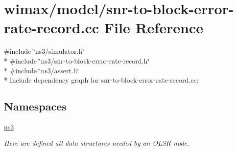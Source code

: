 \hypertarget{snr-to-block-error-rate-record_8cc}{}\section{wimax/model/snr-\/to-\/block-\/error-\/rate-\/record.cc File Reference}
\label{snr-to-block-error-rate-record_8cc}
{\ttfamily \#include \char`\"{}ns3/simulator.\+h\char`\"{}}\\*
{\ttfamily \#include \char`\"{}ns3/snr-\/to-\/block-\/error-\/rate-\/record.\+h\char`\"{}}\\*
{\ttfamily \#include \char`\"{}ns3/assert.\+h\char`\"{}}\\*
Include dependency graph for snr-\/to-\/block-\/error-\/rate-\/record.cc\+:
\subsection*{Namespaces}
\begin{DoxyCompactItemize}
\item 
 \hyperlink{namespacens3}{ns3}
\begin{DoxyCompactList}\small\item\em Here are defined all data structures needed by an O\+L\+SR node. \end{DoxyCompactList}\end{DoxyCompactItemize}
